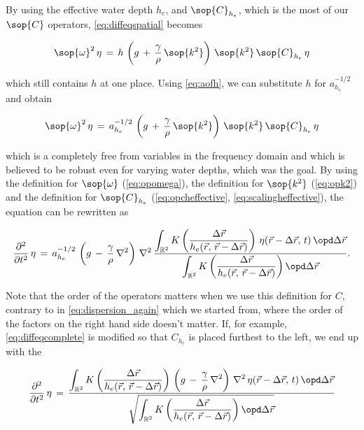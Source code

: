 By using the effective water depth $h_e$, and $\sop{C}_{h_e}$, which is the most  of our $\sop{C}$ operators, \eqref{eq:diffeqspatial} becomes

\begin{equation} \label{eq:diffeqonehstillunknown}
\sop{\omega}^2\,\eta \,=\, h\,\left(g\,+\,\frac{\gamma}{\rho}\,\sop{k^2}\right)\,\sop{k^2}\,\sop{C}_{h_e}\,\eta
\end{equation}

which still contains $h$ at one place. Using \eqref{eq:aofh}, we can substitute $h$ for $a_{h_e}^{-1/2}$ and obtain

\begin{equation} \label{eq:diffeqcomplete}
\sop{\omega}^2\,\eta \,=\, a_{h_e}^{-1/2}\,\left(g\,+\,\frac{\gamma}{\rho}\,\sop{k^2}\right)\,\sop{k^2}\,\sop{C}_{h_e}\,\eta
\end{equation}

which is a \PDE completely free from variables in the frequency domain and which is believed to be robust even for varying water depths, which was the goal. By using the definition for $\sop{\omega}$ (\eqref{eq:opomega}), the definition for $\sop{k^2}$ (\eqref{eq:opk2}) and the definition for $\sop{C}_{h_e}$ (\eqref{eq:opcheffective}, \eqref{eq:scalingheffective}), the equation can be rewritten as

\begin{equation} \label{eq:diffeqnouserdefinedoperators}
\frac{\partial^2}{\partial t^2}\,\eta \,=\, a_{h_e}^{-1/2}\,\left(g\,-\,\frac{\gamma}{\rho}\,\nabla^2\right)\,\nabla^2\,\frac{\displaystyle\int_{\mathbb{R}^2}K\left(\frac{\Delta\vec{r}}{h_e(\vec{r},\,\vec{r}-\Delta\vec{r})}\right)\,\eta(\vec{r}-\Delta\vec{r},\,t)\,\opd\Delta\vec{r}}{\displaystyle\int_{\mathbb{R}^2}K\left(\frac{\Delta\vec{r}}{h_e(\vec{r},\,\vec{r}-\Delta\vec{r})}\right) \opd\Delta\vec{r}}.
\end{equation}

Note that the order of the operators matters when we use this definition for $C$, contrary to in \eqref{eq:dispersion_again} which we started from, where the order of the factors on the right hand side doesn't matter. If, for example, \eqref{eq:diffeqcomplete} is modified so that $C_{h_e}$ is placed furthest to the left, we end up with the \PDE

\begin{equation} \label{eq:diffeqnouserdefinedoperatorsvariant}
\frac{\partial^2}{\partial t^2}\,\eta \,=\, \frac{\displaystyle\int_{\mathbb{R}^2}K\left(\frac{\Delta\vec{r}}{h_e(\vec{r},\,\vec{r}-\Delta\vec{r})}\right)\,\left(g\,-\,\frac{\gamma}{\rho}\,\nabla^2\right)\,\nabla^2\,\eta(\vec{r}-\Delta\vec{r},\,t)\,\opd\Delta\vec{r}}{\sqrt{\displaystyle\int_{\mathbb{R}^2}K\left(\frac{\Delta\vec{r}}{h_e(\vec{r},\,\vec{r}-\Delta\vec{r})}\right) \opd\Delta\vec{r}}}
\end{equation}

